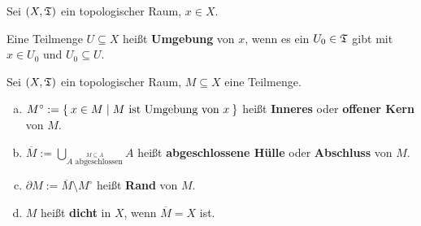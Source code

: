 \begin{definition} 
    Sei $(X, \mathfrak{T})$ ein topologischer Raum, $x \in X$.

    Eine Teilmenge $U \subseteq X$ heißt \textbf{Umgebung} von $x$,
    wenn es ein $U_0 \in \mathfrak{T}$ gibt mit $x \in U_0$ und $U_0 \subseteq U$.
\end{definition}

\begin{definition}
    Sei $(X, \mathfrak{T})$ ein topologischer Raum, $M \subseteq X$ eine Teilmenge.
    \begin{enumerate}[a)]
        \item $M^\circ := \Set{x \in M | M \text{ ist Umgebung von } x}$ heißt \textbf{Inneres} oder \textbf{ offener Kern} von $M$.  
        \item $\displaystyle \overline{M} := \bigcup_{\stackrel{M \subseteq A}{A \text{ abgeschlossen}}} A$ heißt \textbf{abgeschlossene Hülle} oder \textbf{Abschluss} von $M$. 
        \item $\partial M := \overline{M} \setminus M^\circ$ heißt \textbf{Rand} von $M$. 
        \item $M$ heißt \textbf{dicht} in $X$, wenn $\overline{M} = X$ ist. 
    \end{enumerate}
\end{definition}
